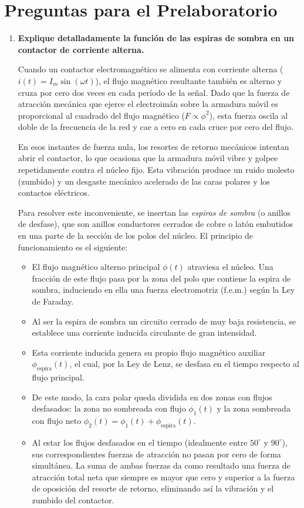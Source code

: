 \section{Preguntas para el Prelaboratorio}

\begin{enumerate}
    \item \textbf{Explique detalladamente la función de las espiras de sombra en un contactor de corriente alterna.}

    Cuando un contactor electromagnético se alimenta con corriente alterna ($i(t) = I_m \sin(\omega t)$), el flujo magnético resultante también es alterno y cruza por cero dos veces en cada período de la señal. Dado que la fuerza de atracción mecánica que ejerce el electroimán sobre la armadura móvil es proporcional al cuadrado del flujo magnético ($F \propto \phi^2$), esta fuerza oscila al doble de la frecuencia de la red y cae a cero en cada cruce por cero del flujo. 

    En esos instantes de fuerza nula, los resortes de retorno mecánicos intentan abrir el contactor, lo que ocasiona que la armadura móvil vibre y golpee repetidamente contra el núcleo fijo. Esta vibración produce un ruido molesto (zumbido) y un desgaste mecánico acelerado de las caras polares y los contactos eléctricos.

    Para resolver este inconveniente, se insertan las \textit{espiras de sombra} (o anillos de desfase), que son anillos conductores cerrados de cobre o latón embutidos en una parte de la sección de los polos del núcleo. El principio de funcionamiento es el siguiente:
    \begin{itemize}
        \item El flujo magnético alterno principal $\phi(t)$ atraviesa el núcleo. Una fracción de este flujo pasa por la zona del polo que contiene la espira de sombra, induciendo en ella una fuerza electromotriz (f.e.m.) según la Ley de Faraday.
        \item Al ser la espira de sombra un circuito cerrado de muy baja resistencia, se establece una corriente inducida circulante de gran intensidad.
        \item Esta corriente inducida genera su propio flujo magnético auxiliar $\phi_{\text{espira}}(t)$, el cual, por la Ley de Lenz, se desfasa en el tiempo respecto al flujo principal.
        \item De este modo, la cara polar queda dividida en dos zonas con flujos desfasados: la zona no sombreada con flujo $\phi_1(t)$ y la zona sombreada con flujo neto $\phi_2(t) = \phi_1(t) + \phi_{\text{espira}}(t)$.
        \item Al estar los flujos desfasados en el tiempo (idealmente entre $50^\circ$ y $90^\circ$), sus correspondientes fuerzas de atracción no pasan por cero de forma simultánea. La suma de ambas fuerzas da como resultado una fuerza de atracción total neta que siempre es mayor que cero y superior a la fuerza de oposición del resorte de retorno, eliminando así la vibración y el zumbido del contactor.
    \end{itemize}


\end{enumerate}

